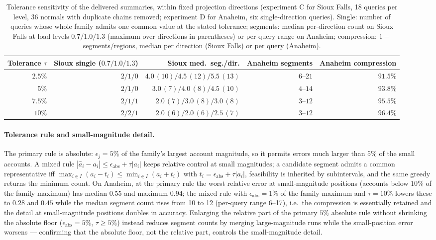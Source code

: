 \begin{table}[pos=htbp]\centering\footnotesize
\caption{Tolerance sensitivity of the delivered summaries, within
fixed projection directions (experiment C for Sioux Falls, 18 queries
per level, 36 normals with duplicate chains removed; experiment D for
Anaheim, six single-direction queries). Single: number of queries whose
whole family admits one common value at the stated tolerance;
segments: median per-direction count on Sioux Falls at load levels
$0.7/1.0/1.3$ (maximum over directions in parentheses) or per-query
range on Anaheim; compression: $1-$segments/regions, median per
direction (Sioux Falls) or per query (Anaheim).}\label{tab:tolerance}
\begin{tabular}{rrrrr}\toprule
Tolerance $\tau$ & Sioux single ($0.7/1.0/1.3$) & Sioux med.\ seg./dir. & Anaheim segments & Anaheim compression\\\midrule
$2.5\%$ & $2/1/0$ & $4.0\,(10)/4.5\,(12)/5.5\,(13)$ & $6$--$21$ & $91.5\%$\\
$5\%$ & $2/1/0$ & $3.0\,(7)/4.0\,(8)/4.5\,(10)$ & $4$--$14$ & $93.8\%$\\
$7.5\%$ & $2/1/1$ & $2.0\,(7)/3.0\,(8)/3.0\,(8)$ & $3$--$12$ & $95.5\%$\\
$10\%$ & $2/2/1$ & $2.0\,(6)/2.0\,(6)/2.5\,(7)$ & $3$--$12$ & $96.4\%$\\
\bottomrule\end{tabular}\end{table}

\paragraph{Tolerance rule and small-magnitude detail.}\label{supp:tolerance}
The primary rule is absolute: $\epsilon_j=5\%$ of the family's largest
account magnitude, so it permits errors much larger than $5\%$ of the
small accounts. A mixed rule
$|\hat a_i-a_i|\le\epsilon_{\mathrm{abs}}+\tau|a_i|$ keeps relative
control at small magnitudes; a candidate segment admits a common
representative iff $\max_{i\in I}(a_i-t_i)\le\min_{i\in I}(a_i+t_i)$
with $t_i=\epsilon_{\mathrm{abs}}+\tau|a_i|$, feasibility is inherited
by subintervals, and the same greedy returns the minimum count. On
Anaheim, at the primary rule the worst relative error at
small-magnitude positions (accounts below $10\%$ of the family
maximum) has median $0.55$ and maximum $0.94$; the mixed rule with
$\epsilon_{\mathrm{abs}}=1\%$ of the family maximum and $\tau=10\%$
lowers these to $0.28$ and $0.45$ while the median segment count rises
from 10 to 12 (per-query range 6--17), i.e.\ the compression is
essentially retained and the detail at small-magnitude positions
doubles in accuracy. Enlarging the relative part of the primary
$5\%$ absolute rule without shrinking the absolute floor
($\epsilon_{\mathrm{abs}}=5\%$, $\tau\ge5\%$) instead reduces
segment counts by merging large-magnitude runs while the
small-position error worsens --- confirming that the absolute floor,
not the relative part, controls the small-magnitude detail.

